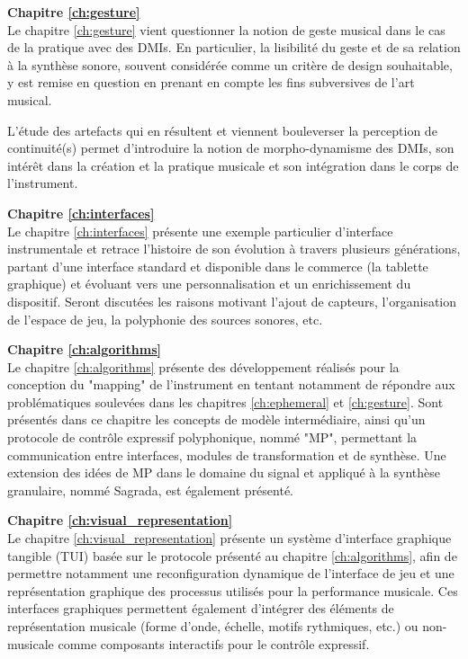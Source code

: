 \textbf{Chapitre \ref{ch:gesture}} \\[0.2em]
Le chapitre \ref{ch:gesture} vient questionner la notion de geste musical dans le cas de la pratique avec des DMIs. En particulier, la lisibilité du geste et de sa relation à la synthèse sonore, souvent considérée comme un critère de design souhaitable, y est remise en question en prenant en compte les fins subversives de l'art musical. 

L'étude des artefacts qui en résultent et viennent bouleverser la perception de continuité(s) permet d'introduire la notion de morpho-dynamisme des DMIs, son intérêt dans la création et la pratique musicale et son intégration dans le corps de l'instrument.

\textbf{Chapitre \ref{ch:interfaces}} \\[0.2em]
Le chapitre \ref{ch:interfaces} présente une exemple particulier d'interface instrumentale et retrace l'histoire de son évolution à travers plusieurs générations, partant d'une interface standard et disponible dans le commerce (la tablette graphique) et évoluant vers une personnalisation et un enrichissement du dispositif. 
Seront discutées les raisons motivant l'ajout de capteurs, l'organisation de l'espace de jeu, la polyphonie des sources sonores, etc.

\textbf{Chapitre \ref{ch:algorithms}} \\[0.2em]
Le chapitre \ref{ch:algorithms} présente des développement réalisés pour la conception du "mapping" de l'instrument en tentant notamment de répondre aux problématiques soulevées dans les chapitres \ref{ch:ephemeral} et \ref{ch:gesture}. Sont présentés dans ce chapitre les concepts de modèle intermédiaire, ainsi qu'un protocole de contrôle expressif polyphonique, nommé "MP", permettant la communication entre interfaces, modules de transformation et de synthèse. Une extension des idées de MP dans le domaine du signal et appliqué à la synthèse granulaire, nommé Sagrada, est également présenté.

\textbf{Chapitre \ref{ch:visual_representation}} \\[0.2em]
Le chapitre \ref{ch:visual_representation} présente un système d'interface graphique tangible (TUI) basée sur le protocole présenté au chapitre  \ref{ch:algorithms}, afin de permettre notamment une reconfiguration dynamique de l'interface de jeu et une représentation graphique des processus utilisés pour la performance musicale. Ces interfaces graphiques permettent également d'intégrer des éléments de représentation musicale (forme d'onde, échelle, motifs rythmiques, etc.) ou non-musicale comme composants interactifs pour le contrôle expressif.

